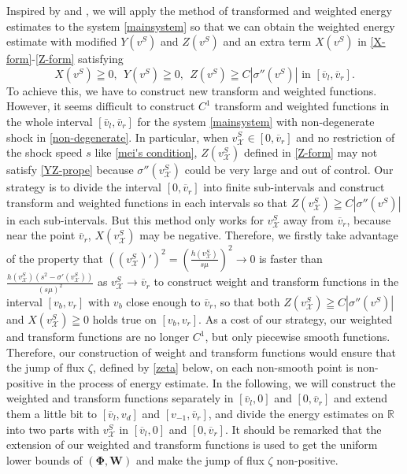 \documentclass[12pt,reqno]{amsart}
\numberwithin{equation}{section}
\def\ph{\mathbf{\Phi}}
\def\w{\mathbf{W}}
\def\vsx{v^S_{\mathcal{X}}}
\def\avl{\overline{v}_l}
\def\avr{\overline{v}_r}
\begin{document}
  Inspired by \cite{Yao.2016, HehuangJDE, HuangYuanCMP} and \cite{Gaijin}, we will apply the method of transformed and  weighted energy estimates to the system \eqref{mainsystem} so that we can obtain the weighted energy estimate with modified $Y(v^S)$ and $Z(v^S)$ and an extra term $X(v^S)$ in \eqref{X-form}-\eqref{Z-form} satisfying 
  \begin{equation}\label{XYZ-cond}
  	X(v^S)\geqq 0, ~~Y(v^S)\geqq0,~~Z(v^S)\geqq C|\sigma''(v^S)|\text{ in }[\avl,\avr].
  \end{equation}
     To achieve this, we have to construct new transform and weighted functions. However, it seems difficult to construct $C^1$ transform and weighted functions in the whole interval $[\bar{v}_l,\bar{v}_r]$ for the system \eqref{mainsystem} with non-degenerate shock in \eqref{non-degenerate}. In particular, when $\vsx \in [0,\avr]$ and no restriction of the shock speed $s$ like \eqref{mei's condition},  $Z(\vsx)$ defined in \eqref{Z-form} may not satisfy \eqref{YZ-prope} because $\sigma''(\vsx)$ could be very large and out of control. Our strategy is to divide the interval $[0,\avr]$ into finite sub-intervals  and construct transform and weighted functions in each intervals so that  $Z(\vsx)\geqq C|\sigma''(v^S)|$ in each sub-intervals. But this method only works for $\vsx$ away from $\avr$, because near the point $\avr$, $X(\vsx)$ may be negative. Therefore, we firstly take advantage of the property that $((\vsx)')^2=(\frac{h(\vsx)}{s\mu} )^2\to 0$ is faster than $\frac{h(\vsx)(s^2-\sigma'(\vsx))}{(s\mu)^2}$ as $\vsx \to \avr$ to construct weight and 
transform functions in the interval $[v_b,v_r] $ with $v_b$ close enough to $\avr$, so that both $Z(\vsx)\geqq C|\sigma''(v^S)|$ and $X(\vsx)\geqq0$ holds true on $[v_b,v_r] $. As a cost of our strategy, our weighted and transform functions are no longer $C^1$, but only piecewise smooth functions. Therefore, 
our construction of weight and transform functions would ensure that the jump of flux $\zeta$, defined by \eqref{zeta} below, on each non-smooth point is non-positive in the process of 
energy estimate. In the following, we will construct the weighted and transform functions separately in  $[\avl,0]$ and $[0,\avr]$ and extend them a little bit to $[\avl,v_d]$ and $[v_{-1},\avr]$, and divide the energy estimates on $\mathbb{R}$ into two parts with
$\vsx$ in $[\avl,0]$ and $[0,\avr]$.
It should be remarked that the extension of our weighted and transform functions is used to get the uniform lower bounds of $(\ph,\w)$ and make the jump of flux $\zeta$ non-positive.
\end{document}
